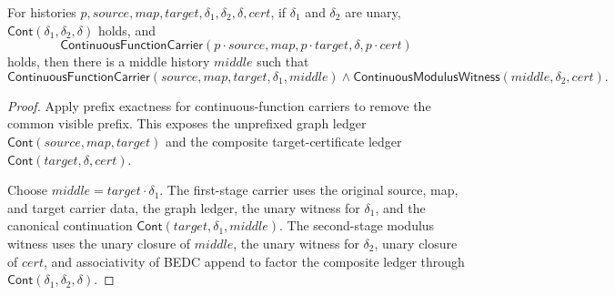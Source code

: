 \begin{theorem}
\label{thm:continuous-function-carrier-prefixed-graph-chain-factorization}
For histories $p,source,map,target,\delta_1,\delta_2,\delta,cert$, if
$\delta_1$ and $\delta_2$ are unary, $\mathsf{Cont}(\delta_1,\delta_2,\delta)$
holds, and
$$
\mathsf{ContinuousFunctionCarrier}
(p\cdot source,map,p\cdot target,\delta,p\cdot cert)
$$
holds, then there is a middle history $middle$ such that
$$
\mathsf{ContinuousFunctionCarrier}(source,map,target,\delta_1,middle)
\land
\mathsf{ContinuousModulusWitness}(middle,\delta_2,cert).
$$
\end{theorem}
\begin{proof}
Apply prefix exactness for continuous-function carriers to remove the common
visible prefix. This exposes the unprefixed graph ledger
$\mathsf{Cont}(source,map,target)$ and the composite target-certificate ledger
$\mathsf{Cont}(target,\delta,cert)$.

Choose $middle=target\cdot\delta_1$. The first-stage carrier uses the original
source, map, and target carrier data, the graph ledger, the unary witness for
$\delta_1$, and the canonical continuation
$\mathsf{Cont}(target,\delta_1,middle)$. The second-stage modulus witness uses
the unary closure of $middle$, the unary witness for $\delta_2$, unary closure
of $cert$, and associativity of BEDC append to factor the composite ledger
through $\mathsf{Cont}(\delta_1,\delta_2,\delta)$.
\end{proof}

